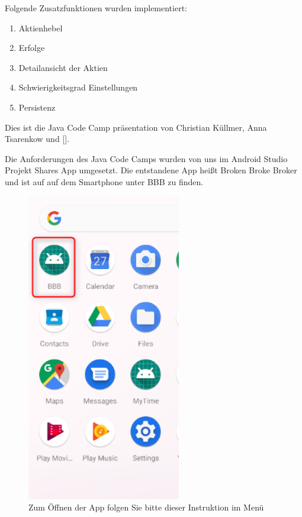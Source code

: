\documentclass[10pt]{scrartcl}
\begin{document}
Folgende Zusatzfunktionen wurden implementiert:

\begin{enumerate}
	\item Aktienhebel
	\item Erfolge
	\item Detailansicht der Aktien
	\item Schwierigkeitsgrad Einstellungen
	\item Persistenz
\end{enumerate}

Dies ist die Java Code Camp präsentation von  Christian Küllmer, Anna Tsarenkow und [].

Die Anforderungen des Java Code Camps wurden von uns im Android Studio Projekt Shares App umgesetzt. Die entstandene App heißt Broken Broke Broker und ist auf auf dem Smartphone unter BBB zu finden.

\begin{figure}[H]
	\centering
	\includegraphics[width=0.6\textwidth]{Bilder/Prsi/StartenDerApp.png}
	\caption{Zum Öffnen der App folgen Sie bitte dieser Instruktion im Menü}
\end{figure}
\end{document}
